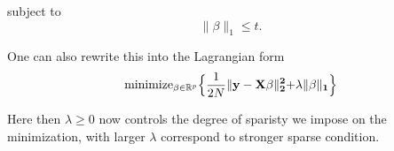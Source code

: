 subject to 
\[\lVert \beta \lVert_1\leq t.\] 

One can also rewrite this into the Lagrangian form
\begin{equation}
  \mathrm{minimize}_{\beta\in \mathbb{R}^p}\Bigl\{ \frac{1}{2N}\lVert \bf{y} - \bf{X}\beta \lVert^2_2 + \lambda \lVert\beta \lVert_1\Bigl\}
\end{equation}

Here then $\lambda \geq 0$ now controls the degree of sparisty we impose on the minimization, with larger $\lambda$ correspond to stronger sparse condition. 